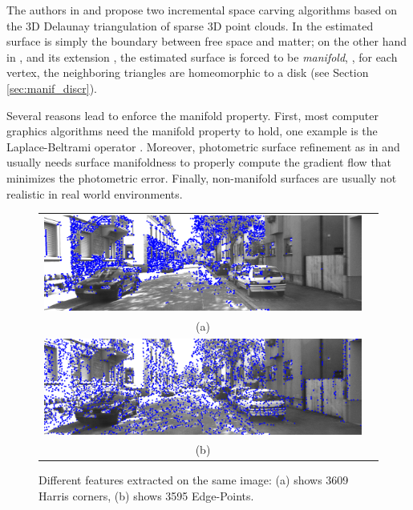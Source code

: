 The authors in \cite{lovi_et_al_11}  and \cite{litvinov_lhuillier_13} propose two incremental space carving algorithms based on the 3D Delaunay triangulation of sparse 3D point clouds. 
In \cite{lovi_et_al_11} the estimated surface is simply the boundary between free space and matter; on the other hand in \cite{litvinov_lhuillier_13}, and its extension \cite{litvinov_Lhiuller14}, the estimated surface is forced to be \emph{manifold}, \ie, for each vertex, the neighboring triangles are homeomorphic to a disk (see Section \ref{sec:manif_discr}). 

Several reasons lead to enforce the manifold property. First, most computer graphics algorithms need the manifold property to hold, one example is the Laplace-Beltrami operator \cite{Meyer03}.
Moreover, photometric surface refinement as in \cite{vu_et_al_2012} and \cite{delaunoy_et_al_08} usually needs surface manifoldness to properly compute the gradient flow that minimizes the photometric error. Finally, non-manifold surfaces are usually not realistic in real world environments.


\begin{figure}[tp]
\centering
\begin{tabular}{cc}
\includegraphics[width=0.92\columnwidth]{./img//harris}\\
(a)\\
\includegraphics[width=0.92\columnwidth]{./img//edgepoints}\\
(b)\\
\end{tabular}
\caption{Different features extracted on the same image: (a) shows 3609 Harris corners, (b) shows 3595 Edge-Points.}
\label{fig:Edge-Points}
\end{figure}


